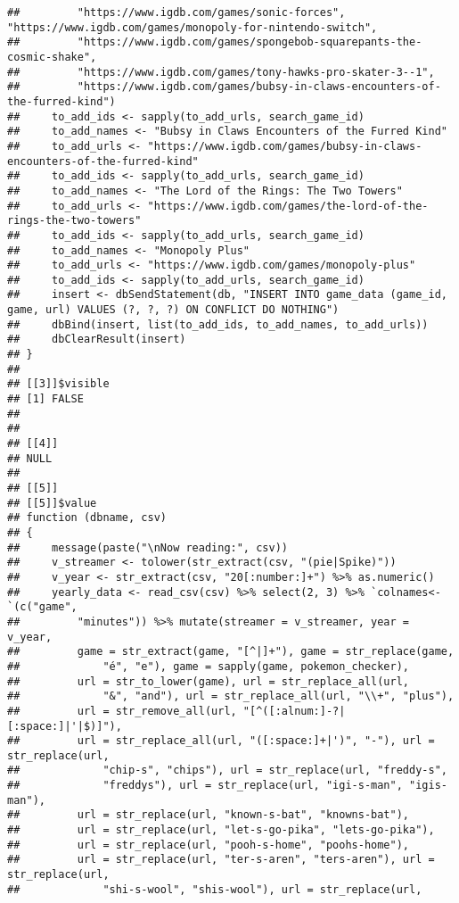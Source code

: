 \documentclass[
]{article}
\begin{document}
\begin{verbatim}
##         "https://www.igdb.com/games/sonic-forces", "https://www.igdb.com/games/monopoly-for-nintendo-switch", 
##         "https://www.igdb.com/games/spongebob-squarepants-the-cosmic-shake", 
##         "https://www.igdb.com/games/tony-hawks-pro-skater-3--1", 
##         "https://www.igdb.com/games/bubsy-in-claws-encounters-of-the-furred-kind")
##     to_add_ids <- sapply(to_add_urls, search_game_id)
##     to_add_names <- "Bubsy in Claws Encounters of the Furred Kind"
##     to_add_urls <- "https://www.igdb.com/games/bubsy-in-claws-encounters-of-the-furred-kind"
##     to_add_ids <- sapply(to_add_urls, search_game_id)
##     to_add_names <- "The Lord of the Rings: The Two Towers"
##     to_add_urls <- "https://www.igdb.com/games/the-lord-of-the-rings-the-two-towers"
##     to_add_ids <- sapply(to_add_urls, search_game_id)
##     to_add_names <- "Monopoly Plus"
##     to_add_urls <- "https://www.igdb.com/games/monopoly-plus"
##     to_add_ids <- sapply(to_add_urls, search_game_id)
##     insert <- dbSendStatement(db, "INSERT INTO game_data (game_id, game, url) VALUES (?, ?, ?) ON CONFLICT DO NOTHING")
##     dbBind(insert, list(to_add_ids, to_add_names, to_add_urls))
##     dbClearResult(insert)
## }
## 
## [[3]]$visible
## [1] FALSE
## 
## 
## [[4]]
## NULL
## 
## [[5]]
## [[5]]$value
## function (dbname, csv) 
## {
##     message(paste("\nNow reading:", csv))
##     v_streamer <- tolower(str_extract(csv, "(pie|Spike)"))
##     v_year <- str_extract(csv, "20[:number:]+") %>% as.numeric()
##     yearly_data <- read_csv(csv) %>% select(2, 3) %>% `colnames<-`(c("game", 
##         "minutes")) %>% mutate(streamer = v_streamer, year = v_year, 
##         game = str_extract(game, "[^|]+"), game = str_replace(game, 
##             "é", "e"), game = sapply(game, pokemon_checker), 
##         url = str_to_lower(game), url = str_replace_all(url, 
##             "&", "and"), url = str_replace_all(url, "\\+", "plus"), 
##         url = str_remove_all(url, "[^([:alnum:]-?|[:space:]|'|$)]"), 
##         url = str_replace_all(url, "([:space:]+|')", "-"), url = str_replace(url, 
##             "chip-s", "chips"), url = str_replace(url, "freddy-s", 
##             "freddys"), url = str_replace(url, "igi-s-man", "igis-man"), 
##         url = str_replace(url, "known-s-bat", "knowns-bat"), 
##         url = str_replace(url, "let-s-go-pika", "lets-go-pika"), 
##         url = str_replace(url, "pooh-s-home", "poohs-home"), 
##         url = str_replace(url, "ter-s-aren", "ters-aren"), url = str_replace(url, 
##             "shi-s-wool", "shis-wool"), url = str_replace(url, 

\end{verbatim}
\end{document}
